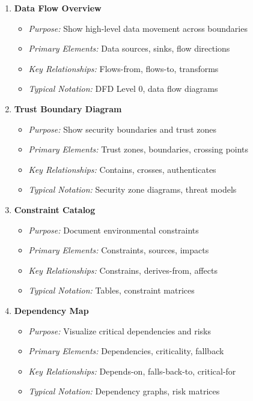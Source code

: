 \documentclass[11pt,letterpaper]{article}
\begin{document}
\begin{enumerate}[label=\textbf{MT\arabic*:}, leftmargin=2.5em]
    \item \textbf{Data Flow Overview}
    \begin{itemize}[nosep]
        \item \textit{Purpose:} Show high-level data movement across boundaries
        \item \textit{Primary Elements:} Data sources, sinks, flow directions
        \item \textit{Key Relationships:} Flows-from, flows-to, transforms
        \item \textit{Typical Notation:} DFD Level 0, data flow diagrams
    \end{itemize}
    
    \item \textbf{Trust Boundary Diagram}
    \begin{itemize}[nosep]
        \item \textit{Purpose:} Show security boundaries and trust zones
        \item \textit{Primary Elements:} Trust zones, boundaries, crossing points
        \item \textit{Key Relationships:} Contains, crosses, authenticates
        \item \textit{Typical Notation:} Security zone diagrams, threat models
    \end{itemize}
    
    \item \textbf{Constraint Catalog}
    \begin{itemize}[nosep]
        \item \textit{Purpose:} Document environmental constraints
        \item \textit{Primary Elements:} Constraints, sources, impacts
        \item \textit{Key Relationships:} Constrains, derives-from, affects
        \item \textit{Typical Notation:} Tables, constraint matrices
    \end{itemize}
    
    \item \textbf{Dependency Map}
    \begin{itemize}[nosep]
        \item \textit{Purpose:} Visualize critical dependencies and risks
        \item \textit{Primary Elements:} Dependencies, criticality, fallback
        \item \textit{Key Relationships:} Depends-on, falls-back-to, critical-for
        \item \textit{Typical Notation:} Dependency graphs, risk matrices
    \end{itemize}
    

\end{enumerate}
\end{document}
